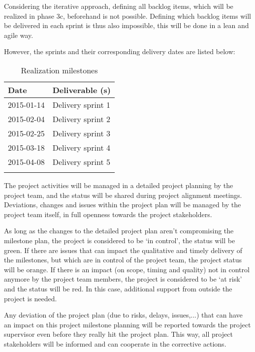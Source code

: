 Considering the iterative approach, defining all backlog items, which will be realized in phase 3c, beforehand is not possible.
Defining which backlog items will be delivered in each sprint is thus also impossible, this will be done in a lean and agile way.

However, the sprints and their corresponding delivery dates  are listed below:
%
\begin{longtable}{|l|l|}\hline
    \textbf{Date} & \textbf{Deliverable (s)} \\\hline
	\endhead
    2015-01-14 & Delivery sprint 1\\\hline
    2015-02-04 & Delivery sprint 2\\\hline
    2015-02-25 & Delivery sprint 3\\\hline
    2015-03-18 & Delivery sprint 4\\\hline
    2015-04-08 & Delivery sprint 5\\\hline
  \caption{Realization milestones}
  \label{tab:realization-milestones}
\end{longtable}

\noindent
The project activities will be managed in a detailed project planning by the project team, and the status will be shared during project alignment meetings.
Deviations, changes and issues within the project plan will be managed by the project team itself, in full openness towards the project stakeholders.

As long as the changes to the detailed project plan aren't  compromising the milestone plan, the project is considered to be `in control', the status will be green.
If there are issues that can impact the qualitative and timely delivery of the milestones, but which are in control of the project team, the project status will be orange.
If there is an impact (on scope, timing and quality) not in control anymore by the project team members, the project is considered to be `at risk' and the status will be red.
In this case, additional support from outside the project is needed.

Any deviation of the project plan (due to risks, delays, issues,...) that can have an impact on this project milestone planning will be reported towards the project supervisor even before they really hit the project plan.
This way, all project stakeholders will be informed and can cooperate in the corrective actions.
